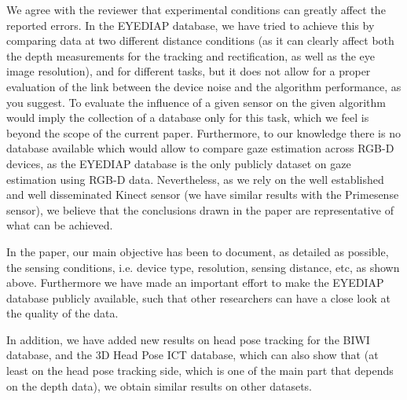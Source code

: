 {\vspace*{2mm}


We agree with the reviewer that experimental conditions can greatly affect the reported errors.
%
In the EYEDIAP database, we have tried to  achieve this by comparing data at two different distance conditions  
(as it can clearly affect both the depth measurements for the tracking and rectification, as well as the eye image resolution), 
and for different tasks,
but it does not allow for a proper evaluation of the link between the device noise and the algorithm performance, as you suggest.
% 
To evaluate the influence of a given sensor on the given algorithm would imply the collection of a database only for this task, 
which we feel is beyond the scope of the current paper.
%
Furthermore, to our knowledge there is no database available which would allow to compare gaze estimation across RGB-D devices, 
as the EYEDIAP database is the only publicly dataset on gaze estimation using RGB-D data.
%
Nevertheless, as we rely on the well established and well disseminated Kinect sensor (we have similar results with the Primesense sensor), we believe that the conclusions
drawn in the paper are representative of what can be achieved.

\qquad 


In the paper, our main objective has been to document, as detailed as possible, the sensing conditions, i.e. device type, resolution, sensing distance, etc, as shown above.
Furthermore we have made an important effort to make the EYEDIAP database publicly available,  such that other researchers can have a close
look at the quality of the data.


In addition, we have added new results on head pose tracking for the BIWI database, and the 3D Head Pose ICT database, which can also show that (at least on the head pose 
tracking side, which is one of the main part that depends on the depth data), we obtain similar results on other datasets.


}
